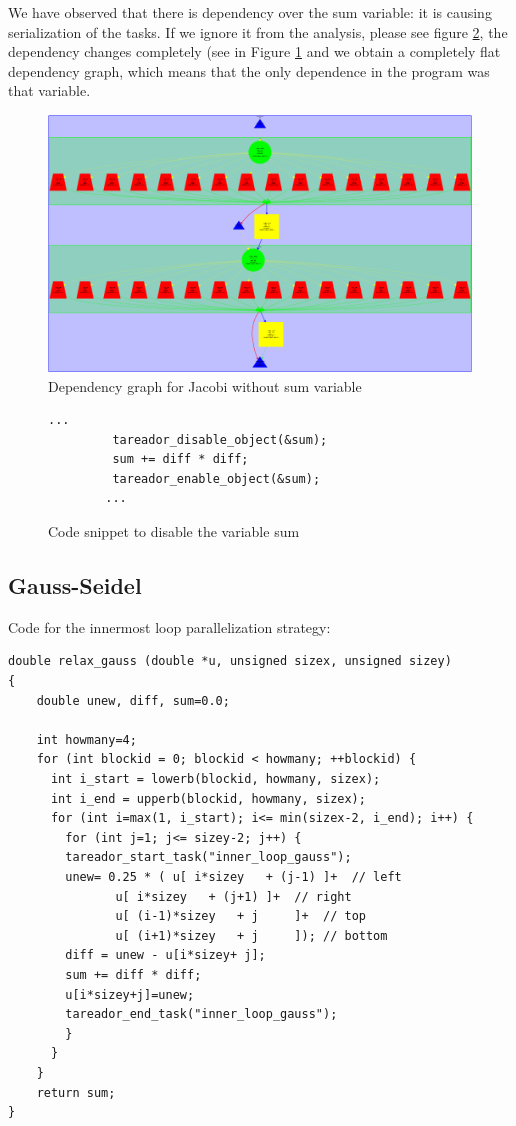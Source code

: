 \documentclass[12]{article}
\begin{document}
We have observed that there is dependency over the sum variable: it is causing serialization of the tasks. If we ignore it from the analysis, please see figure \ref{code}, the dependency changes completely (see in Figure \ref{jacobi_dependency2} and we obtain a completely flat dependency graph, which means that the only dependence in the program was that variable.
\begin{figure}[H]
    \centering
    \includegraphics[scale=0.75]{images/dependency_jacobi2.png}
    \caption{Dependency graph for Jacobi without sum variable}
    \label{jacobi_dependency2}
\end{figure}

\begin{figure}[H]
\begin{lstlisting}[frame=single]
         ...
         tareador_disable_object(&sum);
         sum += diff * diff;
         tareador_enable_object(&sum);
        ...
\end{lstlisting}
\caption{Code snippet to disable the variable sum}
\label{code}
\end{figure}

\subsection{Gauss-Seidel}
Code for the innermost loop parallelization strategy:
\medskip

\begin{lstlisting}[frame=single]
double relax_gauss (double *u, unsigned sizex, unsigned sizey)
{
    double unew, diff, sum=0.0;

    int howmany=4;
    for (int blockid = 0; blockid < howmany; ++blockid) {
      int i_start = lowerb(blockid, howmany, sizex);
      int i_end = upperb(blockid, howmany, sizex);
      for (int i=max(1, i_start); i<= min(sizex-2, i_end); i++) {
        for (int j=1; j<= sizey-2; j++) {
	    tareador_start_task("inner_loop_gauss");
	    unew= 0.25 * ( u[ i*sizey	+ (j-1) ]+  // left
			   u[ i*sizey	+ (j+1) ]+  // right
			   u[ (i-1)*sizey	+ j     ]+  // top
			   u[ (i+1)*sizey	+ j     ]); // bottom
	    diff = unew - u[i*sizey+ j];
	    sum += diff * diff; 
	    u[i*sizey+j]=unew;
	    tareador_end_task("inner_loop_gauss");
        }
      }
    }
    return sum;
}
\end{lstlisting}
\end{document}
